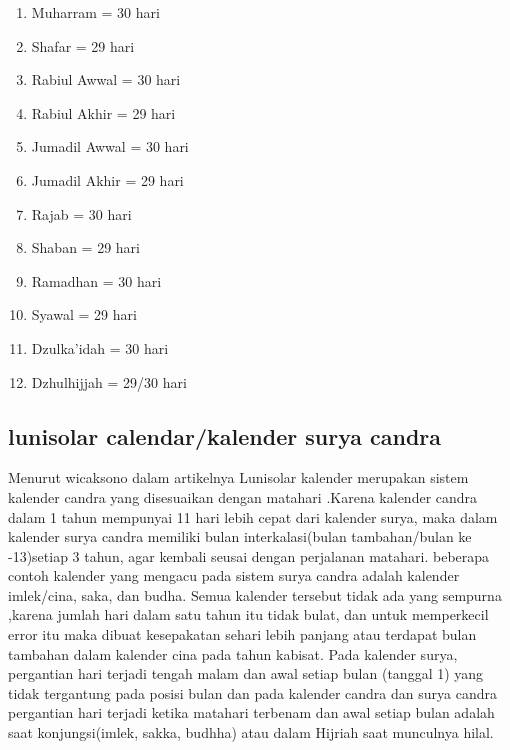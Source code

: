    \begin{enumerate}
        \item Muharram      = 30 hari
        \item Shafar        = 29 hari
        \item Rabiul Awwal  = 30 hari
        \item Rabiul Akhir  = 29 hari
        \item Jumadil Awwal = 30 hari
        \item Jumadil Akhir = 29 hari
        \item Rajab         = 30 hari
        \item Shaban        = 29 hari
        \item Ramadhan      = 30 hari
        \item Syawal        = 29 hari
        \item Dzulka'idah   = 30 hari
        \item Dzhulhijjah   = 29/30 hari
    \end{enumerate}

  \subsection{lunisolar calendar/kalender surya candra}
      Menurut wicaksono dalam artikelnya Lunisolar kalender merupakan sistem kalender candra yang disesuaikan dengan matahari \cite{wicaksono2008ta}.Karena kalender candra dalam 1 tahun mempunyai 11 hari lebih cepat dari kalender surya, maka dalam kalender surya candra memiliki bulan interkalasi(bulan tambahan/bulan ke -13)setiap 3 tahun, agar kembali seusai dengan perjalanan matahari.
    beberapa contoh kalender yang mengacu pada sistem surya candra adalah kalender imlek/cina, saka, dan budha. Semua kalender tersebut tidak ada yang sempurna ,karena jumlah hari dalam satu tahun itu tidak bulat, dan untuk memperkecil error itu maka dibuat kesepakatan sehari lebih panjang atau terdapat bulan tambahan dalam kalender cina pada tahun kabisat\cite{wicaksono2008ta}.
    Pada kalender surya, pergantian hari terjadi tengah malam dan awal setiap bulan (tanggal 1) yang tidak tergantung pada posisi bulan dan pada kalender candra dan surya candra pergantian hari terjadi ketika matahari terbenam dan awal setiap bulan adalah saat konjungsi(imlek, sakka, budhha) atau dalam Hijriah saat munculnya hilal.
